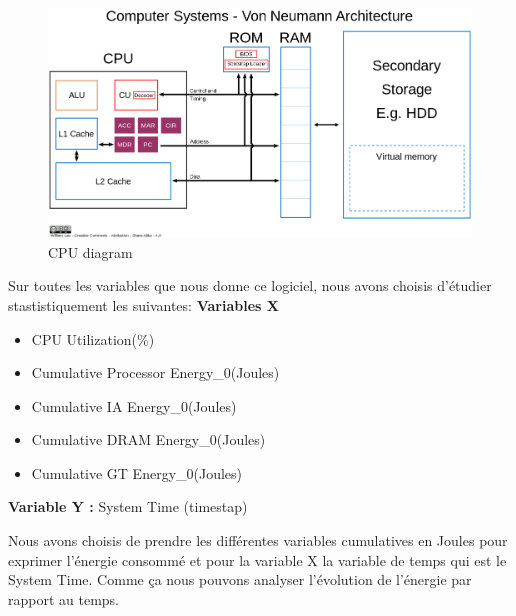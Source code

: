 \documentclass[12pt, a4paper]{report}
\begin{document}
\begin{figure}[H]
    \centering
    \includegraphics[width=1\linewidth]{res//CPT-Von_neumann_architecture.svg.png}
    \caption{CPU diagram}
    \label{fig:cpu_diagram}
\end{figure}

Sur toutes les variables que nous donne ce logiciel, nous avons choisis d'étudier stastistiquement les suivantes:
\textbf{Variables X}
\begin{itemize}
    \item CPU Utilization(\%)	
    \item Cumulative Processor Energy\_0(Joules)
    \item Cumulative IA Energy\_0(Joules)
    \item Cumulative DRAM Energy\_0(Joules)
    \item Cumulative GT Energy\_0(Joules)
\end{itemize}

\textbf{Variable Y : } System Time (timestap)

Nous avons choisis de prendre les différentes variables cumulatives en Joules pour exprimer l'énergie consommé et pour la variable X la variable de temps qui est le System Time. Comme ça nous pouvons analyser l'évolution de l'énergie par rapport au temps.
\end{document}
